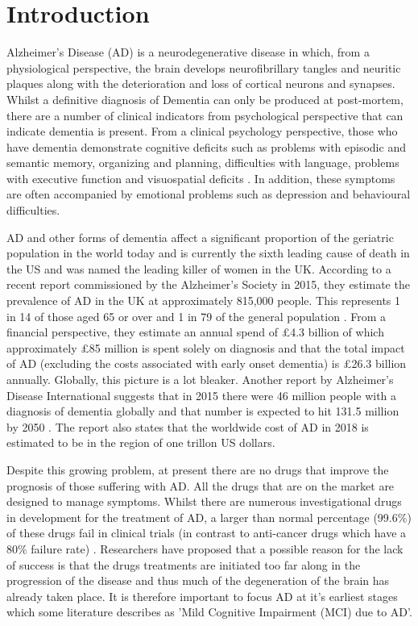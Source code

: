 \documentclass[10pt, letterpaper, twoside, openany]{book}
\begin{document}
\section{Introduction}
Alzheimer's Disease (AD) is a neurodegenerative disease in which, from a physiological perspective, the brain develops neurofibrillary tangles and neuritic plaques along with the deterioration and loss of cortical neurons and synapses. Whilst a definitive diagnosis of Dementia can only be produced at post-mortem, there are a number of clinical indicators from psychological perspective that can indicate dementia is present. From a clinical psychology perspective, those who have dementia demonstrate cognitive deficits such as problems with episodic and semantic memory, organizing and planning, difficulties with language, problems with executive function and visuospatial deficits \cite{McKhann2011}. In addition, these symptoms are often accompanied by emotional problems such as depression and behavioural difficulties. 
\par
AD and other forms of dementia affect a significant proportion of the geriatric population in the world today and is currently the sixth leading cause of death in the US and was named the leading killer of women in the UK. According to a recent report commissioned by the Alzheimer's Society in 2015, they estimate the prevalence of AD in the UK at approximately 815,000 people. This represents 1 in 14 of those aged 65 or over and 1 in 79 of the general population \cite{AlzheimersSociety2014}. From a financial perspective, they estimate an annual spend of £4.3 billion of which approximately £85 million is spent solely on diagnosis and that the total impact of AD (excluding the costs associated with early onset dementia) is £26.3 billion annually. Globally, this picture is a lot bleaker. Another report by Alzheimer's Disease International suggests that in 2015 there were 46 million people with a diagnosis of dementia globally and that number is expected to hit 131.5 million by 2050 \cite{Prince2015}. The report also states that the worldwide cost of AD in 2018 is estimated to be in the region of one trillon US dollars.
\par
Despite this growing problem, at present there are no drugs that improve the prognosis of those suffering with AD. All the drugs that are on the market are designed to manage symptoms. Whilst there are numerous investigational drugs in development for the treatment of AD, a larger than normal percentage (99.6\%) of these drugs fail in clinical trials (in contrast to anti-cancer drugs which have a 80\% failure rate) \cite{AlzheimersSociety2014}. Researchers have proposed that a possible reason for the lack of success is that the drugs treatments are initiated too far along in the progression of the disease and thus much of the degeneration of the brain has already taken place. It is therefore important to focus AD at it's earliest stages which some literature describes as 'Mild Cognitive Impairment (MCI) due to AD'.
\end{document}
